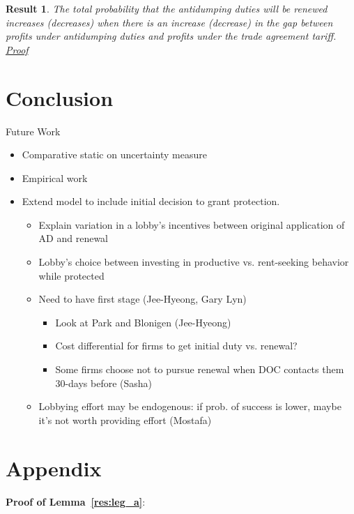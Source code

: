 \documentclass[10pt]{article}
\newtheorem{result}{Result}
\begin{document}
\begin{result}
	The total probability that the antidumping duties will be renewed increases (decreases) when there is an increase (decrease) in the gap between profits under antidumping duties and profits under the trade agreement tariff. \hyperlink{Pr_pi_total}{Proof}
	\label{res:pi_total}
\end{result}







\section{Conclusion}
\label{sec:concl}
			
			Future Work

\begin{itemize}
	\item Comparative static on uncertainty measure
	\item Empirical work
	\item Extend model to include initial decision to grant protection.
		\begin{itemize}
			\item Explain variation in a lobby's incentives between original application of AD and renewal
			\item Lobby's choice between investing in productive vs. rent-seeking behavior while protected
			\item Need to have first stage (Jee-Hyeong, Gary Lyn)
		\begin{itemize}
			\item Look at Park and Blonigen (Jee-Hyeong)
			\item Cost differential for firms to get initial duty vs. renewal?
			\item Some firms choose not to pursue renewal when DOC contacts them 30-days before (Sasha)
		\end{itemize}
	\item Lobbying effort may be endogenous: if prob. of success is lower, maybe it's not worth providing effort (Mostafa)
		\end{itemize}
\end{itemize}




\section{Appendix}
\label{sec:appendix}
\noindent \textbf{\hypertarget{Pr_leg_a}{Proof of Lemma~\ref{res:leg_a}}}:
\end{document}
